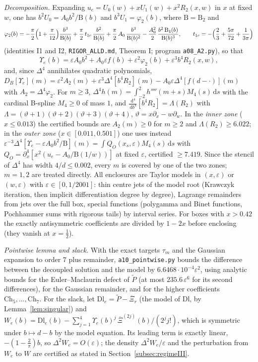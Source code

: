 \documentclass[11pt]{amsart}
\theoremstyle{definition}
\theoremstyle{remark}
\numberwithin{equation}{section}
\newcommand{\Xb}{\overline{\Xi}}
\newcommand{\dd}{\,\mathrm{d}}
\begin{document}
\emph{Decomposition.} Expanding $u_e=U_0(w)+xU_1(w)+x^2R_2(x,w)$ in $x$ at fixed $w$, one has $b^2U_0=A_0b^2/\mathrm B(b)$ and
$b^3U_1=\varphi_2(b)$, where $\mathrm B=\mathrm B_2$ and
\[
\varphi_2(b)=-\frac\pi2\Bigl(1+\frac\pi{12}\Bigr)\frac{b^3}{\mathrm B(b)}+\frac\pi2\,t_{1c}\,\frac{b^2}{\mathrm B(b)}
+\frac\pi2\,A_0\,\frac{b^3}{\mathrm B(b)^2}-\frac{A_0^2}2\,\frac{b^2\,\mathrm B_4(b)}{\mathrm B(b)^3},\qquad
t_{1c}=-\Bigl(\frac23+\frac{5\pi}{72}+\frac1{3\pi}\Bigr)
\]
(identities I1 and I2, \texttt{RIGOR\_ALLD.md}, Theorem I; program \texttt{a08\_A2.py}), so that
\[
\Upsilon_e(b)=\varepsilon A_0b^2+A_0\varepsilon f(b)+\varepsilon^2\varphi_2(b)+\varepsilon^3b^4R_2(x,w),
\]
and, since $\Delta^4$ annihilates quadratic polynomials,
$D_B[\Upsilon_e](m)=\varepsilon^2A_2(m)+\varepsilon^3\Delta^4[b^4R_2](m)-A_0\varepsilon\Delta^4[f(d-\cdot)](m)$ with $A_2=\Delta^4\varphi_2$. For $m\ge3$,
$\Delta^4h(m)=\int_{-2}^2h''''(m+s)M_4(s)\dd s$ with the cardinal B-spline $M_4\ge0$ of mass $1$, and
$\frac{\dd^4}{\dd b^4}[b^4R_2]=\Lambda(R_2)$ with $\Lambda=(\vartheta+1)(\vartheta+2)(\vartheta+3)(\vartheta+4)$, $\vartheta=x\partial_x-w\partial_w$. In the
\emph{inner zone} ($x\le0.013$) the certified bounds are $A_2(m)\ge0$ for $m\ge2$ and $\Lambda(R_2)\ge6.022$; in the \emph{outer zone}
($x\in[0.011,0.501]$) one uses instead $\varepsilon^{-3}\Delta^4[\Upsilon_e-\varepsilon A_0b^2/\mathrm B](m)=\int Q_O(x_s,\varepsilon)M_4(s)\dd s$ with
$Q_O=\partial_x^4[x^2(u_e-A_0/\mathrm B(1/w))]$ at fixed $\varepsilon$, certified $\ge7.419$. Since the stencil of $\Delta^4$ has width
$4/d\le0.002$, every $m$ is covered by one of the two zones; $m=1,2$ are treated directly. All enclosures are Taylor models in
$(x,\varepsilon)$ or $(w,\varepsilon)$ with $\varepsilon\in[0,1/2001]$: thin centre jets of the model root (Krawczyk iteration, then
implicit differentiation degree by degree), Lagrange remainders from jets over the full box, special functions (polygamma
and Binet functions, Pochhammer sums with rigorous tails) by interval series. For boxes with $x>0.42$ the exactly
antisymmetric coefficients are divided by $1-2x$ before enclosing (they vanish at $x=\frac12$).

\emph{Pointwise lemma and slack.} With the exact targets $\tau_m$ and the Gaussian expansion to order $7$ plus remainder,
\texttt{a10\_pointwise.py} bounds the difference between the decoupled solution and the model by $6.6468\cdot10^{-4}\varepsilon^2$,
using analytic bounds for the Euler--Maclaurin defect of $\tilde P$ (at most $235.6\,\varepsilon^6$ for its second differences), for
the Gaussian remainder, and for the higher coefficients $\mathrm{Ch}_5,\dots,\mathrm{Ch}_7$. For the slack, let
$\mathrm{Dl}_e=\tilde P-\Xb_r$ (the model of $\mathrm{Dl}$, by Lemma~\ref{lem:singular}) and
$W_e(b)=\mathrm{Dl}_e(b)-\sum_{j=1}^4\Upsilon_e(b)^j\,\Xb^{(2j)}(b)/(2^jj!)$, which is symmetric under $b\mapsto d-b$ by the model
equation. Its leading term is exactly linear, $-(1-\frac2\pi)b$, so $\Delta^2W_e=O(\varepsilon)$; the density
$\Delta^2W_e/\varepsilon$ and the perturbation from $W_e$ to $W$ are certified as stated in Section~\ref{subsec:regimeIII}.
\end{document}
